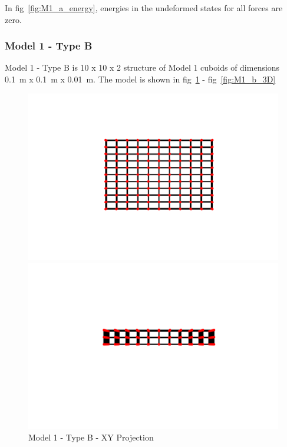 In fig~\ref{fig:M1_a_energy}, energies in the undeformed states for all forces are zero.

\subsubsection{Model 1 - Type B}
Model 1 - Type B is 10 x 10 x 2 structure of Model 1 cuboids of dimensions 0.1~m x 0.1~m x 0.01~m. The model is shown in fig~\ref{fig:M1_b_XY} - fig~\ref{fig:M1_b_3D}

\begin{figure}[!htbp]
\begin{minipage}{0.3\textwidth}
    \centering
    \includegraphics[width = 1\textwidth]{Figures/M1_b_XY.png}
    \caption{Model 1 - Type B - XY Projection}
    \label{fig:M1_b_XY}
\end{minipage}
\hspace{5mm}
\begin{minipage}{0.3\textwidth}
    \centering
    \includegraphics[width = 1\textwidth]{Figures/M1_b_YZ.png}

\end{minipage}
\end{figure}
